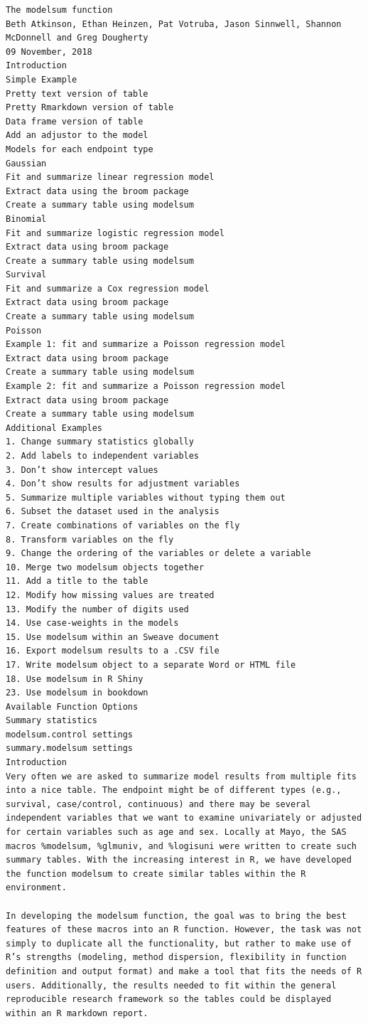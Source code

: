 \documentclass[
]{book}
\begin{document}
\begin{verbatim}
The modelsum function
Beth Atkinson, Ethan Heinzen, Pat Votruba, Jason Sinnwell, Shannon McDonnell and Greg Dougherty
09 November, 2018
Introduction
Simple Example
Pretty text version of table
Pretty Rmarkdown version of table
Data frame version of table
Add an adjustor to the model
Models for each endpoint type
Gaussian
Fit and summarize linear regression model
Extract data using the broom package
Create a summary table using modelsum
Binomial
Fit and summarize logistic regression model
Extract data using broom package
Create a summary table using modelsum
Survival
Fit and summarize a Cox regression model
Extract data using broom package
Create a summary table using modelsum
Poisson
Example 1: fit and summarize a Poisson regression model
Extract data using broom package
Create a summary table using modelsum
Example 2: fit and summarize a Poisson regression model
Extract data using broom package
Create a summary table using modelsum
Additional Examples
1. Change summary statistics globally
2. Add labels to independent variables
3. Don’t show intercept values
4. Don’t show results for adjustment variables
5. Summarize multiple variables without typing them out
6. Subset the dataset used in the analysis
7. Create combinations of variables on the fly
8. Transform variables on the fly
9. Change the ordering of the variables or delete a variable
10. Merge two modelsum objects together
11. Add a title to the table
12. Modify how missing values are treated
13. Modify the number of digits used
14. Use case-weights in the models
15. Use modelsum within an Sweave document
16. Export modelsum results to a .CSV file
17. Write modelsum object to a separate Word or HTML file
18. Use modelsum in R Shiny
23. Use modelsum in bookdown
Available Function Options
Summary statistics
modelsum.control settings
summary.modelsum settings
Introduction
Very often we are asked to summarize model results from multiple fits into a nice table. The endpoint might be of different types (e.g., survival, case/control, continuous) and there may be several independent variables that we want to examine univariately or adjusted for certain variables such as age and sex. Locally at Mayo, the SAS macros %modelsum, %glmuniv, and %logisuni were written to create such summary tables. With the increasing interest in R, we have developed the function modelsum to create similar tables within the R environment.

In developing the modelsum function, the goal was to bring the best features of these macros into an R function. However, the task was not simply to duplicate all the functionality, but rather to make use of R’s strengths (modeling, method dispersion, flexibility in function definition and output format) and make a tool that fits the needs of R users. Additionally, the results needed to fit within the general reproducible research framework so the tables could be displayed within an R markdown report.


\end{verbatim}
\end{document}
